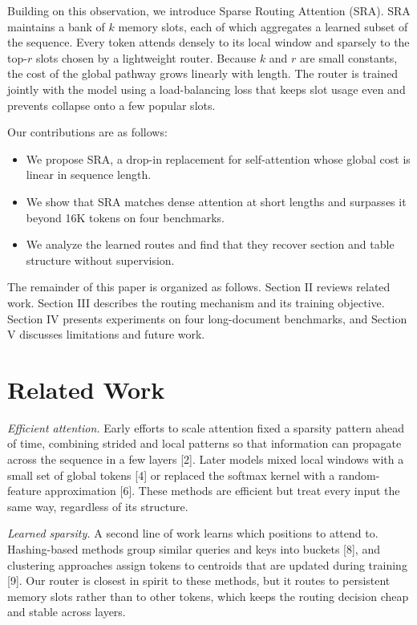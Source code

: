 \documentclass[conference,letterpaper]{IEEEtran}
\begin{document}
Building on this observation, we introduce Sparse Routing Attention (SRA). SRA maintains a bank of $k$ memory slots, each of which aggregates a learned subset of the sequence. Every token attends densely to its local window and sparsely to the top-$r$ slots chosen by a lightweight router. Because $k$ and $r$ are small constants, the cost of the global pathway grows linearly with length. The router is trained jointly with the model using a load-balancing loss that keeps slot usage even and prevents collapse onto a few popular slots.

Our contributions are as follows:
\begin{itemize}
\item We propose SRA, a drop-in replacement for self-attention whose global cost is linear in sequence length.
\item We show that SRA matches dense attention at short lengths and surpasses it beyond 16K tokens on four benchmarks.
\item We analyze the learned routes and find that they recover section and table structure without supervision.
\end{itemize}

The remainder of this paper is organized as follows. Section II reviews related work. Section III describes the routing mechanism and its training objective. Section IV presents experiments on four long-document benchmarks, and Section V discusses limitations and future work.

\section{Related Work}

\textit{Efficient attention.} Early efforts to scale attention fixed a sparsity pattern ahead of time, combining strided and local patterns so that information can propagate across the sequence in a few layers [2]. Later models mixed local windows with a small set of global tokens [4] or replaced the softmax kernel with a random-feature approximation [6]. These methods are efficient but treat every input the same way, regardless of its structure.

\textit{Learned sparsity.} A second line of work learns which positions to attend to. Hashing-based methods group similar queries and keys into buckets [8], and clustering approaches assign tokens to centroids that are updated during training [9]. Our router is closest in spirit to these methods, but it routes to persistent memory slots rather than to other tokens, which keeps the routing decision cheap and stable across layers.
\end{document}
